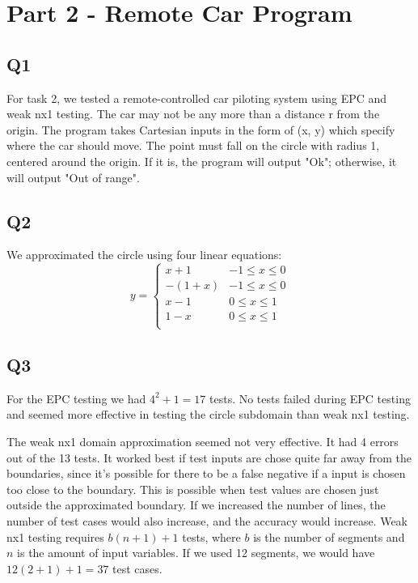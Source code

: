 \documentclass[12pt, letterpaper, titlepage]{article}
\begin{document}
\section{Part 2 - Remote Car Program}
\subsection{Q1}
For task 2, we tested a remote-controlled car piloting system using EPC and weak nx1 testing. The car may not be any more than a distance r from the origin. The program takes Cartesian inputs in the form of (x, y) which specify where the car should move. The point must fall on the circle with radius 1, centered around the origin. If it is, the program will output "Ok"; otherwise, it will output "Out of range".

\subsection{Q2}
We approximated the circle using four linear equations: 
\begin{equation}
  y = \begin{cases}
      x + 1 & -1 \leq x \leq 0 \\
      -(1+x) & -1 \leq x \leq 0 \\
      x - 1 & 0 \leq x \leq 1 \\
      1-x & 0 \leq x \leq 1 \\
  \end{cases}
\end{equation}
\subsection{Q3}
For the EPC testing we had $4^2 + 1 = 17$ tests. No tests failed during EPC testing and seemed more effective in testing the circle subdomain than weak nx1 testing.

The weak nx1 domain approximation seemed not very effective. It had 4 errors out of the 13 tests. It worked best if test inputs are chose quite far away from the boundaries, since it's possible for there to be a false negative if a input is chosen too close to the boundary. This is possible when test values are chosen just outside the approximated boundary. If we increased the number of lines, the number of test cases would also increase, and the accuracy would increase. Weak nx1 testing requires $b(n+1)+1$ tests, where $b$ is the number of segments and $n$ is the amount of input variables. If we used 12 segments, we would have $12(2+1)+1 = 37$ test cases.
\end{document}
